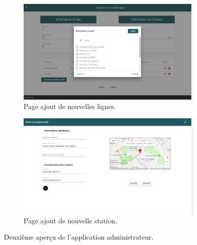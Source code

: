 \begin{figure}[h!]
	 \begin{subfigure}[b]{\linewidth}
	 	\includegraphics[width=\linewidth]{img/spuf/stationadd.png}
	 	\caption{Page ajout de nouvelles lignes.}	 
	 \end{subfigure}
	 
	 \begin{subfigure}[b]{\linewidth}
	 	\includegraphics[width=\linewidth]{img/spuf/createstation.png}
	 	\caption{Page ajout de nouvelle station.}	 
	 \end{subfigure}
	 \caption{Deuxième aperçu de l'application administrateur.}
	 \label{fig:adminInterface2}
\end{figure}